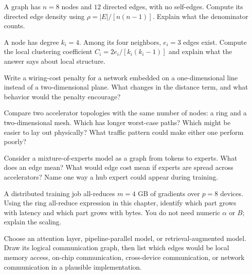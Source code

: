 \begin{exercises}
\item A graph has \(n=8\) nodes and \(12\) directed edges, with no self-edges. Compute its directed edge density using \(\rho=|E|/[n(n-1)]\). Explain what the denominator counts.
\item A node has degree \(k_i=4\). Among its four neighbors, \(e_i=3\) edges exist. Compute the local clustering coefficient \(C_i=2e_i/[k_i(k_i-1)]\) and explain what the answer says about local structure.
\item Write a wiring-cost penalty for a network embedded on a one-dimensional line instead of a two-dimensional plane. What changes in the distance term, and what behavior would the penalty encourage?
\item Compare two accelerator topologies with the same number of nodes: a ring and a two-dimensional mesh. Which has longer worst-case paths? Which might be easier to lay out physically? What traffic pattern could make either one perform poorly?
\item Consider a mixture-of-experts model as a graph from tokens to experts. What does an edge mean? What would edge cost mean if experts are spread across accelerators? Name one way a hub expert could appear during training.
\item A distributed training job all-reduces \(m=4\) GB of gradients over \(p=8\) devices. Using the ring all-reduce expression in this chapter, identify which part grows with latency and which part grows with bytes. You do not need numeric \(\alpha\) or \(B\); explain the scaling.
\item Choose an attention layer, pipeline-parallel model, or retrieval-augmented model. Draw its logical communication graph, then list which edges would be local memory access, on-chip communication, cross-device communication, or network communication in a plausible implementation.
\end{exercises}
